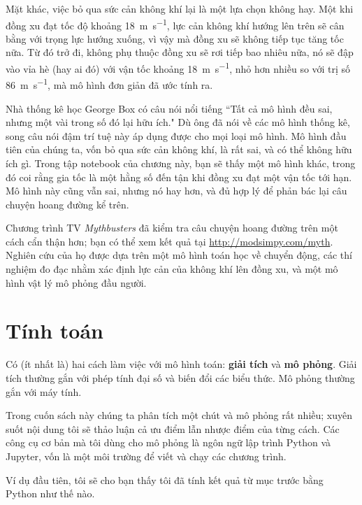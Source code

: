 \documentclass[12pt, openany]{book}
\theoremstyle{exercise}
\begin{document}
Mặt khác, việc bỏ qua sức cản không khí lại là một lựa chọn không hay. Một khi đồng xu đạt tốc độ khoảng \SI{18}{\meter\per\second}, lực cản không khí hướng lên trên sẽ cân bằng với trọng lực hướng xuống, vì vậy mà đồng xu sẽ không tiếp tục tăng tốc nữa. Từ đó trở đi, không phụ thuộc đồng xu sẽ rơi tiếp bao nhiêu nữa, nó sẽ đập vào vỉa hè (hay ai đó) với vận tốc khoảng \SI{18}{\meter\per\second}, nhỏ hơn nhiều so với trị số \SI{86}{\meter\per\second}, mà mô hình đơn giản đã ước tính ra.

Nhà thống kê học George Box có câu nói nổi tiếng ``Tất cả mô hình đều sai, nhưng một vài trong số đó lại hữu ích."  Dù ông đã nói về các mô hình thống kê, song câu nói đậm trí tuệ này áp dụng được cho mọi loại mô hình. Mô hình đầu tiên của chúng ta, vốn bỏ qua sức cản không khí, là rất sai, và có thể không hữu ích gì. Trong tập notebook của chương này, bạn sẽ thấy một mô hình khác, trong đó coi rằng gia tốc là một hằng số đến tận khi đồng xu đạt một vận tốc tới hạn. Mô hình này cũng vẫn sai, nhưng nó hay hơn, và đủ hợp lý để phản bác lại câu chuyện hoang đường kể trên.


Chương trình TV {\it Mythbusters} đã kiểm tra câu chuyện hoang đường trên một cách cẩn thận hơn; bạn có thể xem kết quả tại \url{http://modsimpy.com/myth}.  Nghiên cứu của họ được dựa trên một mô hình toán học về chuyển động, các thí nghiệm đo đạc nhằm xác định lực cản của không khí lên đồng xu, và một mô hình vật lý mô phỏng đầu người.



\section{Tính toán}
\label{computation}

Có (ít nhất là) hai cách làm việc với mô hình toán: {\bf giải tích} và {\bf mô phỏng}.  Giải tích thường gắn với phép tính đại số và biến đổi các biểu thức. Mô phỏng thường gắn với máy tính.

Trong cuốn sách này chúng ta phân tích một chút và mô phỏng rất nhiều; xuyên suốt nội dung tôi sẽ thảo luận cả ưu điểm lẫn nhược điểm của từng cách. Các công cụ cơ bản mà tôi dùng cho mô phỏng là ngôn ngữ lập trình Python và Jupyter, vốn là một môi trường để viết và chạy các chương trình.

Ví dụ đầu tiên, tôi sẽ cho bạn thấy tôi đã tính kết quả từ mục trước bằng Python như thế nào. 
\end{document}
